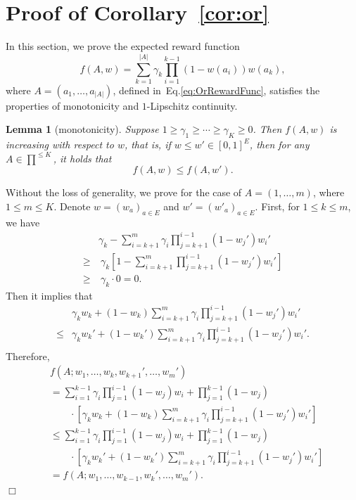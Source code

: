 \documentclass{article}
\newcommand{\abs}[1]{\left| #1 \right|}
\newtheorem{lemma}[theorem]{Lemma}%
\newenvironment{proof}{\noindent {\textbf{Proof. }}}{$\Box$ \medskip}
\begin{document}
\section{Proof of Corollary~\ref{cor:or}}

In this section, we prove the expected reward function
$$
f(A,w) = \sum_{k = 1}^{\abs{A}} \gamma_{k} \prod_{i=1}^{k-1} (1 - w(a_i)) w(a_k),
$$
where $A = (a_1, \ldots, a_{|A|})$, defined in~Eq.\eqref{eq:OrRewardFunc}, satisfies the properties of monotonicity and $1$-Lipschitz continuity.

\begin{lemma}[monotonicity]
	\label{lem:orMonotonicity}
	Suppose $1 \geq \gamma_1 \geq \cdots \geq \gamma_K \geq 0$. Then $f(A, w)$ is increasing with respect to $w$, that is, if $w \leq w' \in [0,1]^E$, then for any $A \in \prod^{\leq K}$, it holds that
	$$
	f(A, w) \leq f(A, w').
	$$
\end{lemma}
\begin{proof}
	Without the loss of generality, we prove for the case of $A = (1, \ldots, m)$, where $1 \leq m \leq K$. Denote $w = (w_a)_{a \in E}$ and $w' = (w'_a)_{a \in E}$. First, for $1 \leq k \leq m$, we have
	\begin{align*}
		&\gamma_{k} - \sum_{i=k+1}^m \gamma_i \prod_{j = k + 1}^{i - 1} (1 - w_j') w_i'\\
		\geq &~\gamma_k [1 - \sum_{i=k+1}^m \prod_{j=k+1}^{i-1}(1 - w_j') w_i']\\
		\geq &~\gamma_{k} \cdot 0 = 0.
	\end{align*}
	Then it implies that
	\begin{align*}
		&\gamma_k w_k + (1 - w_k)\sum_{i=k+1}^m \gamma_i \prod_{j=k+1}^{i-1}(1 - w_j') w_i'\\
		\leq &\gamma_k w_k' + (1 - w_k')\sum_{i=k+1}^m \gamma_i \prod_{j=k+1}^{i-1}(1 - w_j') w_i'.\\
	\end{align*}
	Therefore, 
	\begin{align*}
		& f(A; w_1, \dots, w_k, w_{k+1}', \dots, w_m')\\
		&=\sum_{i=1}^{k-1} \gamma_i \prod_{j=1}^{i-1}(1 - w_j) w_i + \prod_{j=1}^{k-1}(1 - w_j) \\
		&\qquad \cdot [\gamma_k w_k + (1 - w_k)\sum_{i=k+1}^m \gamma_i \prod_{j=k+1}^{i-1}(1 - w_j') w_i']\\
		&\leq \sum_{i=1}^{k-1} \gamma_i \prod_{j=1}^{i-1}(1 - w_j) w_i + \prod_{j=1}^{k-1}(1 - w_j) \\
		&\qquad \cdot [\gamma_k w_k' + (1 - w_k')\sum_{i=k+1}^m \gamma_i \prod_{j=k+1}^{i-1}(1 - w_j') w_i']\\
		&=f(A; w_1, \ldots, w_{k-1}, w_{k}', \ldots, w_m').
	\end{align*}
\end{proof}
\end{document}
